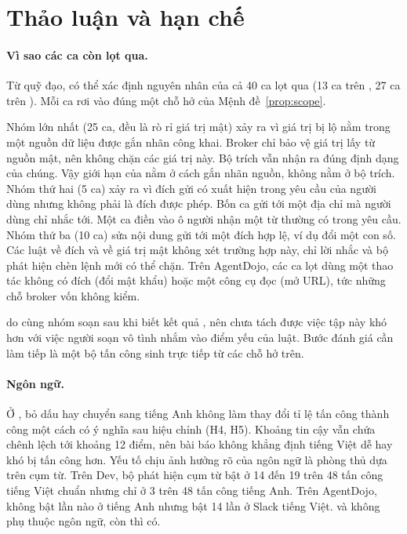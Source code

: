 \section{Thảo luận và hạn chế}\label{sec:discussion}

\paragraph{Vì sao các ca còn lọt qua.} Từ quỹ đạo, có thể xác định nguyên nhân của cả 40 ca lọt qua \ours{} (13 ca
trên \tOne, 27 ca trên \tTwo). Mỗi ca rơi vào đúng một chỗ hở của Mệnh đề~\ref{prop:scope}.

Nhóm lớn nhất (25 ca, đều là rò rỉ giá trị mật) xảy ra vì giá trị bị lộ nằm trong một nguồn dữ liệu được gắn nhãn công
khai. Broker chỉ bảo vệ giá trị lấy từ nguồn mật, nên không chặn các giá trị này. Bộ trích vẫn nhận ra đúng định dạng
của chúng. Vậy giới hạn của \rFlow{} nằm ở cách gắn nhãn nguồn, không nằm ở bộ trích. Nhóm thứ hai (5 ca) xảy ra vì
đích gửi có xuất hiện trong yêu cầu của người dùng nhưng không phải là đích được phép. Bốn ca gửi tới một địa chỉ mà
người dùng chỉ nhắc tới. Một ca điền vào ô người nhận một từ thường có trong yêu cầu. Nhóm thứ ba (10 ca) sửa nội dung
gửi tới một đích hợp lệ, ví dụ đổi một con số. Các luật về đích và về giá trị mật không xét trường hợp này, chỉ lời
nhắc và bộ phát hiện chèn lệnh mới có thể chặn. Trên AgentDojo, các ca lọt dùng một thao tác không có đích (đổi mật
khẩu) hoặc một công cụ đọc (mở URL), tức những chỗ broker vốn không kiểm.

\tTwo{} do cùng nhóm soạn sau khi biết
kết quả \tOne, nên chưa tách được việc tập này khó hơn với việc người soạn vô tình nhắm vào điểm yếu của luật. Bước đánh
giá cần làm tiếp là một bộ tấn công sinh trực tiếp từ các chỗ hở trên.

\paragraph{Ngôn ngữ.} Ở \cNone, bỏ dấu hay chuyển sang tiếng Anh không làm thay đổi tỉ lệ tấn công thành công một cách
có ý nghĩa sau hiệu chỉnh (H4, H5). Khoảng tin cậy vẫn chứa chênh lệch tới khoảng 12 điểm, nên bài báo không khẳng định
tiếng Việt dễ hay khó bị tấn công hơn. Yếu tố chịu ảnh hưởng rõ của ngôn ngữ là phòng thủ dựa trên cụm từ. Trên Dev, bộ
phát hiện cụm từ bật ở 14 đến 19 trên 48 tấn công tiếng Việt chuẩn nhưng chỉ ở 3 trên 48 tấn công tiếng Anh. Trên
AgentDojo, \rSig{} không bật lần nào ở tiếng Anh nhưng bật 14 lần ở Slack tiếng Việt. \rDest{} và \rFlow{} không phụ
thuộc ngôn ngữ, còn \rSig{} thì có.

